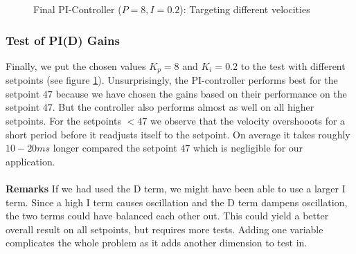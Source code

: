 \begin{figure}[H]
    \centering
{}
    \caption{Final PI-Controller ($P=8, I=0.2$): Targeting different velocities} \label{fig:PI_final}
\end{figure}

\subsubsection{Test of PI(D) Gains}
Finally, we put the chosen values $K_p = 8$ and $K_i = 0.2$ to the test with different setpoints (see figure \ref{fig:PI_final}). Unsurprisingly, the PI-controller performs best for the setpoint $47$ because we have chosen the gains based on their performance on the setpoint $47$.
But the controller also performs almost as well on all higher setpoints. For the setpoints $<47$ we observe that the velocity overshooots for a short period before it readjusts itself to the setpoint. On average it takes roughly $10-20 ms$ longer compared the setpoint $47$ which is negligible for our application.\\\\
\textbf{Remarks}
If we had used the D term, we might have been able to use a larger I term. Since a high I term causes oscillation and the D term dampens oscillation, the two terms could have balanced each other out. This could yield a better overall result on all setpoints, but requires more tests. Adding one variable complicates the whole problem as it adds another dimension to test in.


